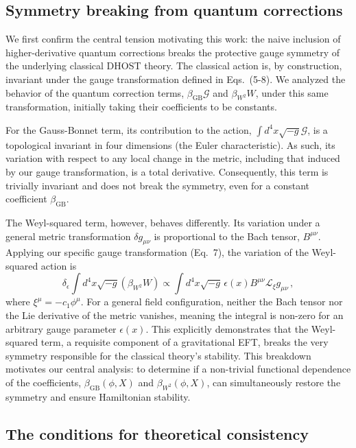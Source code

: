 \documentclass[twocolumn]{aastex631}
\begin{document}
\subsection{Symmetry breaking from quantum corrections}

We first confirm the central tension motivating this work: the naive inclusion of higher-derivative quantum corrections breaks the protective gauge symmetry of the underlying classical DHOST theory. The classical action is, by construction, invariant under the gauge transformation defined in Eqs.~(5-8). We analyzed the behavior of the quantum correction terms, $\beta_{\text{GB}}\mathcal{G}$ and $\beta_{W^2}W$, under this same transformation, initially taking their coefficients to be constants.

For the Gauss-Bonnet term, its contribution to the action, $\int d^4x \sqrt{-g} \mathcal{G}$, is a topological invariant in four dimensions (the Euler characteristic). As such, its variation with respect to any local change in the metric, including that induced by our gauge transformation, is a total derivative. Consequently, this term is trivially invariant and does not break the symmetry, even for a constant coefficient $\beta_{\text{GB}}$.

The Weyl-squared term, however, behaves differently. Its variation under a general metric transformation $\delta g_{\mu\nu}$ is proportional to the Bach tensor, $B^{\mu\nu}$. Applying our specific gauge transformation (Eq.~7), the variation of the Weyl-squared action is
\begin{equation}
    \delta_\epsilon \int d^4x \sqrt{-g} (\beta_{W^2} W) \propto \int d^4x \sqrt{-g} \, \epsilon(x) B^{\mu\nu} \mathcal{L}_{\xi} g_{\mu\nu} \,,
\end{equation}
where $\xi^\mu = -c_1 \phi^\mu$. For a general field configuration, neither the Bach tensor nor the Lie derivative of the metric vanishes, meaning the integral is non-zero for an arbitrary gauge parameter $\epsilon(x)$. This explicitly demonstrates that the Weyl-squared term, a requisite component of a gravitational EFT, breaks the very symmetry responsible for the classical theory's stability. This breakdown motivates our central analysis: to determine if a non-trivial functional dependence of the coefficients, $\beta_{\text{GB}}(\phi, X)$ and $\beta_{W^2}(\phi, X)$, can simultaneously restore the symmetry and ensure Hamiltonian stability.

\subsection{The conditions for theoretical consistency}
\end{document}
